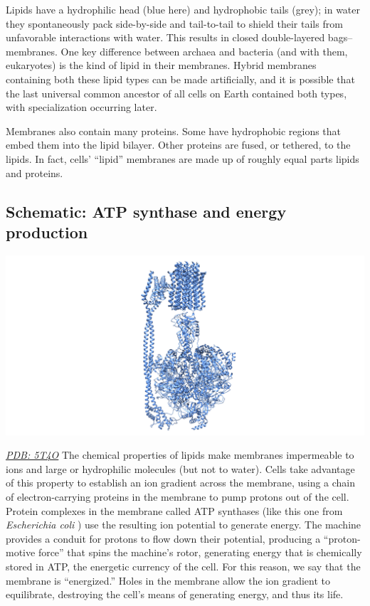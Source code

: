 \documentclass[]{tufte-book}
\begin{document}
Lipids have a hydrophilic head (blue here) and hydrophobic tails (grey); in water they spontaneously pack side-by-side and tail-to-tail to shield their tails from unfavorable interactions with water. This results in closed double-layered bags--membranes. One key difference between archaea and bacteria (and with them, eukaryotes) is the kind of lipid in their membranes. Hybrid membranes containing both these lipid types can be made artificially, and it is possible that the last universal common ancestor of all cells on Earth contained both types, with specialization occurring later.

Membranes also contain many proteins. Some have hydrophobic regions that embed them into the lipid bilayer. Other proteins are fused, or tethered, to the lipids. In fact, cells' ``lipid'' membranes are made up of roughly equal parts lipids and proteins.

\hypertarget{ATP_synthase_and_energy_production}{%
\subsection*{Schematic: ATP synthase and energy production}\label{ATP_synthase_and_energy_production}}

\includegraphics{img/schematics/2_1_2}

\href{http://rcsb.org/structure/5T4O}{\emph{PDB: 5T4O}}
The chemical properties of lipids make membranes impermeable to ions and large or hydrophilic molecules (but not to water). Cells take advantage of this property to establish an ion gradient across the membrane, using a chain of electron-carrying proteins in the membrane to pump protons out of the cell. Protein complexes in the membrane called ATP synthases (like this one from \emph{Escherichia coli} \citep{sobti2016}) use the resulting ion potential to generate energy. The machine provides a conduit for protons to flow down their potential, producing a ``proton-motive force'' that spins the machine's rotor, generating energy that is chemically stored in ATP, the energetic currency of the cell. For this reason, we say that the membrane is ``energized.'' Holes in the membrane allow the ion gradient to equilibrate, destroying the cell's means of generating energy, and thus its life.
\end{document}
